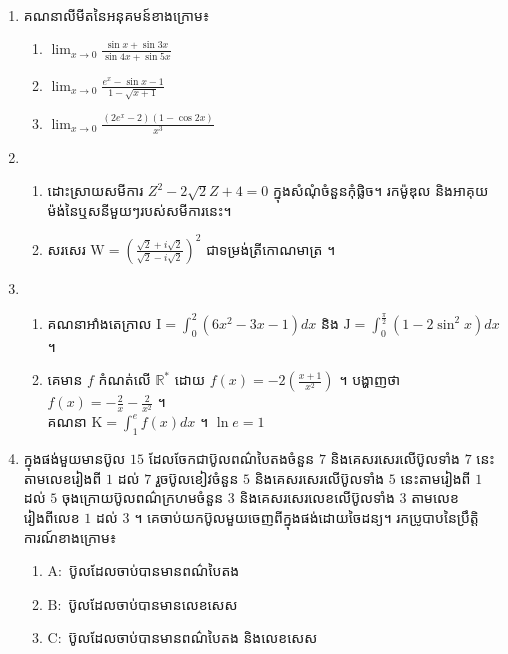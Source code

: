 \documentclass{officialexam}
\begin{document}
	{\maketitle}\\
	\begin{enumerate}[I]
		\item គណនាលីមីតនៃអនុគមន៍ខាងក្រោម៖
		\begin{enumerate}[k,3]
			\item $\lim_{x\to0}\frac{\sin x+\sin3x}{\sin4x+\sin5x}$
			\item $\lim_{x\to0}\frac{e^x-\sin x-1}{1-\sqrt{x+1}}$
			\item $\lim_{x\to0}\frac{(2e^x-2)(1-\cos2x)}{x^3}$
		\end{enumerate}
		\item\begin{enumerate}[k]
			\item ដោះស្រាយសមីការ $Z^2-2\sqrt{2}Z+4=0$ ក្នុងសំណុំចំនួនកុំផ្លិច។ រកម៉ូឌុល និងអាគុយម៉ង់នៃឬសនីមួយៗរបស់សមីការនេះ។
			\item សរសេរ $\mathrm{W}=\left(\frac{\sqrt{2}+i\sqrt{2}}{\sqrt{2}-i\sqrt{2}}\right)^2$ ជាទម្រង់ត្រីកោណមាត្រ ។
		\end{enumerate}
		\item \begin{enumerate}[k]
			\item គណនាអាំងតេក្រាល $\mathrm{I}=\int_0^2\left(6x^2-3x-1\right)dx$ និង $\mathrm{J}=\int_{0}^{\frac{\pi}{2}}\left(1-2\sin^2x\right)dx$ ។
			\item គេមាន $f$ កំណត់លើ $\mathbb{R^*}$ ដោយ $f(x)=-2\left(\frac{x+1}{x^2}\right)$ ។ បង្ហាញថា $f(x)=-\frac{2}{x}-\frac{2}{x^2}$ ។\\
			គណនា $\mathrm{K}=\int_{1}^{e}f(x)dx$ ។ $\ln e=1$
		\end{enumerate}
		\item ក្នុងផង់មួយមានប៊ូល $15$ ដែលចែកជាប៊ូលពណ៌បៃតងចំនួន $7$ និងគេសរសេរលើប៊ូលទាំង $7$ នេះតាមលេខរៀងពី $1$ ដល់ $7$ រួចប៊ូលខៀវចំនួន $5$ និងគេសរសេរលើប៊ូលទាំង $5$ នេះតាមរៀងពី $1$ ដល់ $5$ ចុងក្រោយប៊ូលពណ៌ក្រហមចំនួន $3$ និងគេសរសេរលេខលើប៊ូលទាំង $3$ តាមលេខរៀងពីលេខ $1$ ដល់ $3$ ។ គេចាប់យកប៊ូលមួយចេញពីក្នុងផង់ដោយចៃដន្យ។ រកប្រូបាបនៃប្រឹត្តិការណ៍ខាងក្រោម៖ 
		\begin{enumerate}[k]
			\item $\mathrm{A}:$ ប៊ូលដែលចាប់បានមានពណ៌បៃតង
			\item $\mathrm{B}:$ ប៊ូលដែលចាប់បានមានលេខសេស
			\item $\mathrm{C}:$ ប៊ូលដែលចាប់បានមានពណ៌បៃតង និងលេខសេស
		\end{enumerate}

\end{enumerate}
\end{document}
